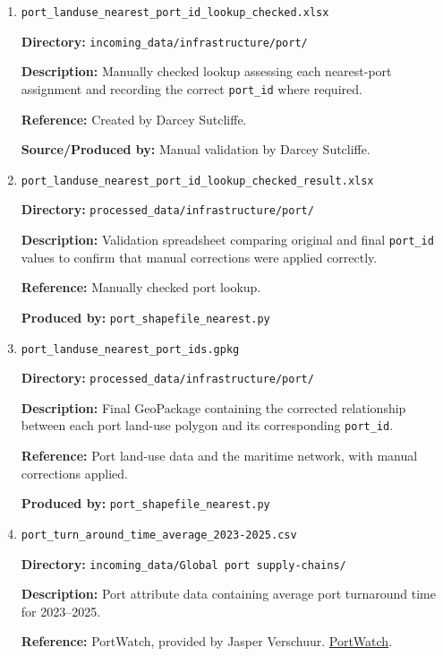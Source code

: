 \documentclass[11pt,a4paper]{article}
\begin{document}
\begin{enumerate}
\medskip

\item \texttt{port\_landuse\_nearest\_port\_id\_lookup\_checked.xlsx}\par
\textbf{Directory:} \texttt{incoming\_data/infrastructure/port/}\par
\textbf{Description:} Manually checked lookup assessing each nearest-port assignment and recording the correct \texttt{port\_id} where required.\par
\textbf{Reference:} Created by Darcey Sutcliffe.\par
\textbf{Source/Produced by:} Manual validation by Darcey Sutcliffe.\par

\medskip

\item \texttt{port\_landuse\_nearest\_port\_id\_lookup\_checked\_result.xlsx}\par
\textbf{Directory:} \texttt{processed\_data/infrastructure/port/}\par
\textbf{Description:} Validation spreadsheet comparing original and final \texttt{port\_id} values to confirm that manual corrections were applied correctly.\par
\textbf{Reference:} Manually checked port lookup.\par
\textbf{Produced by:} \texttt{port\_shapefile\_nearest.py}\par

\medskip

\item \texttt{port\_landuse\_nearest\_port\_ids.gpkg}\par
\textbf{Directory:} \texttt{processed\_data/infrastructure/port/}\par
\textbf{Description:} Final GeoPackage containing the corrected relationship between each port land-use polygon and its corresponding \texttt{port\_id}.\par
\textbf{Reference:} Port land-use data and the maritime network, with manual corrections applied.\par
\textbf{Produced by:} \texttt{port\_shapefile\_nearest.py}\par

\medskip

\item \texttt{port\_turn\_around\_time\_average\_2023-2025.csv}\par
\textbf{Directory:} \texttt{incoming\_data/Global port supply-chains/}\par
\textbf{Description:} Port attribute data containing average port turnaround time for 2023--2025.\par
\textbf{Reference:} PortWatch, provided by Jasper Verschuur. \href{https://portwatch.imf.org/}{PortWatch}.\par


\end{enumerate}
\end{document}
